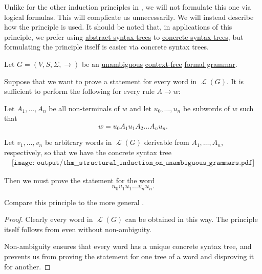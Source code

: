 \begin{theorem}\label{thm:structural_induction_on_unambiguous_grammars}\mimprovised
  Unlike for the other induction principles in , we will not formulate this one via logical formulas. This will complicate us unnecessarily. We will instead describe how the principle is used. It should be noted that, in applications of this principle, we prefer using \hyperref[rem:abstract_syntax_tree]{abstract syntax trees} to \hyperref[def:concrete_syntax_tree]{concrete syntax trees}, but formulating the principle itself is easier via concrete syntax trees.

  Let \( G = (V, S, \Sigma, \to) \) be an \hyperref[def:chomsky_hierarchy/context_free]{unambiguous} \hyperref[def:chomsky_hierarchy/context_free]{context-free} \hyperref[def:formal_grammar]{formal grammar}.

  Suppose that we want to prove a statement for every word in \( \mscrL(G) \). It is sufficient to perform the following for every rule \( A \to w \):
  \begin{displayquote}
    Let \( A_1, \ldots, A_n \) be all non-terminals of \( w \) and let \( u_0, \ldots, u_n \) be subwords of \( w \) such that
    \begin{equation*}
      w = u_0 A_1 u_1 A_2 \ldots A_n u_n.
    \end{equation*}

    Let \( v_1, \ldots, v_n \) be arbitrary words in \( \mscrL(G) \) derivable from \( A_1, \ldots, A_n \), respectively, so that we have the concrete syntax tree
    \begin{equation*}
      \begin{aligned}
        \texttt{[image: output/thm\_\_structural\_induction\_on\_unambiguous\_grammars.pdf]}
      \end{aligned}
    \end{equation*}

    Then we must prove the statement for the word
    \begin{equation*}
      u_0 v_1 u_1 \ldots v_n u_n.
    \end{equation*}
  \end{displayquote}

  Compare this principle to the more general .
\end{theorem}
\begin{proof}
  Clearly every word in \( \mscrL(G) \) can be obtained in this way. The principle itself follows from  even without non-ambiguity.

  Non-ambiguity ensures that every word has a unique concrete syntax tree, and prevents us from proving the statement for one tree of a word and disproving it for another.
\end{proof}

